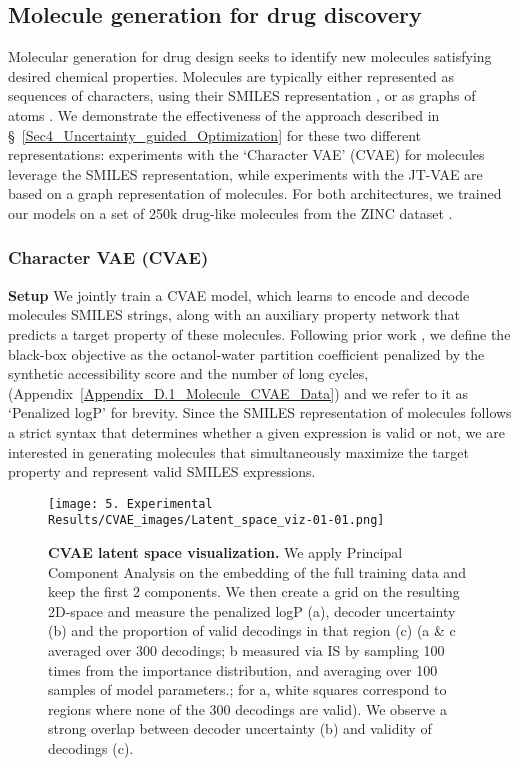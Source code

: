 \subsection{Molecule generation for drug discovery}

Molecular generation for drug design seeks to identify new molecules satisfying desired chemical properties. Molecules are typically either represented as sequences of characters, using their SMILES representation \citep{weininger88smiles}, or as graphs of atoms \citep{duvenaud2015convolutional}. We demonstrate the effectiveness of the approach described in \S~\ref{Sec4_Uncertainty_guided_Optimization} for these two different representations: experiments with the `Character VAE' (CVAE) for molecules \citep{Gomez_Bombarelli_2018} leverage the SMILES representation, while experiments with the JT-VAE \citep{jin2019junction} are based on a graph representation of molecules. For both architectures, we trained our models on a set of 250k drug-like molecules from the ZINC dataset \citep{Irwin2012ZINCAF}.

\subsubsection{Character VAE (CVAE)}
\label{Sec5_CVAE}

\textbf{Setup} We jointly train a CVAE model, which learns to encode and decode molecules SMILES strings, along with an auxiliary property network that predicts a target property of these molecules. Following prior work \citep{kusner2017grammar, dai2018syntaxdirected, jin2019junction}, we define the black-box objective as the octanol-water partition coefficient penalized by the synthetic accessibility score and the number of long cycles, (Appendix~\ref{Appendix_D.1_Molecule_CVAE_Data}) and we refer to it as `Penalized logP' for brevity.
Since the SMILES representation of molecules follows a strict syntax that determines whether a given expression is valid or not, we are interested in generating molecules that simultaneously maximize the target property and represent valid SMILES expressions.

\begin{figure*}[h]
    \centering
    \texttt{[image: 5. Experimental Results/CVAE\_images/Latent\_space\_viz-01-01.png]}
    \vspace{-1mm}
    \caption{\textbf{CVAE latent space visualization.} We apply Principal Component Analysis on the embedding of the full training data and keep the first 2 components. We then create a grid on the resulting 2D-space and measure the penalized logP (a), decoder uncertainty (b) and the proportion of valid decodings in that region (c) (a \& c averaged over 300 decodings; b measured via IS by sampling 100 times from the importance distribution, and averaging over 100 samples of model parameters.; for a, white squares correspond to regions where none of the 300 decodings are valid). We observe a strong overlap between decoder uncertainty (b) and validity of decodings (c).}
    \label{Fig_CVAE_Latent_space_viz}
\end{figure*}
\vspace{-1mm}

